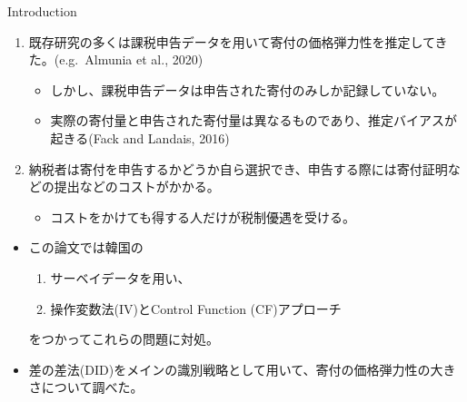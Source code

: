\documentclass[dvipdfmx,10pt]{beamer}
\begin{document}
	\begin{frame}{Introduction}
		\protect\hypertarget{introduction-1}{}
		\begin{enumerate}
			\item 既存研究の多くは課税申告データを用いて寄付の価格弾力性を推定してきた。(e.g.~Almunia et al., 2020)
			\begin{itemize}
				\item しかし、課税申告データは申告された寄付のみしか記録していない。
				\item 実際の寄付量と申告された寄付量は異なるものであり、推定バイアスが起きる(Fack and Landais, 2016)
			\end{itemize}
			\item 納税者は寄付を申告するかどうか自ら選択でき、申告する際には寄付証明などの提出などのコストがかかる。
			\begin{itemize}
				\item コストをかけても得する人だけが税制優遇を受ける。
			\end{itemize}
		\end{enumerate}
	\begin{itemize}
		\item この論文では韓国の
		\begin{enumerate}
			\item サーベイデータを用い、
			\item 操作変数法(IV)とControl Function (CF)アプローチ
		\end{enumerate}
		\flushright	をつかってこれらの問題に対処。
		\flushleft
		\item 差の差法(DID)をメインの識別戦略として用いて、寄付の価格弾力性の大きさについて調べた。
		\end{itemize}
	\end{frame}
	
\end{document}
